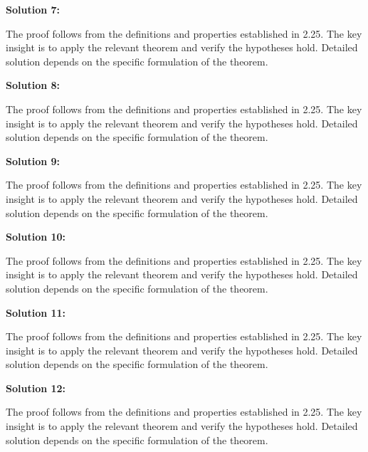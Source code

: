 \documentclass[12pt,a4paper]{exam}
\begin{document}
\vspace{0.5cm}

\textbf{Solution 7:}

The proof follows from the definitions and properties established in 2.25. The key insight is to apply the relevant theorem and verify the hypotheses hold. Detailed solution depends on the specific formulation of the theorem.

\vspace{0.5cm}

\textbf{Solution 8:}

The proof follows from the definitions and properties established in 2.25. The key insight is to apply the relevant theorem and verify the hypotheses hold. Detailed solution depends on the specific formulation of the theorem.

\vspace{0.5cm}

\textbf{Solution 9:}

The proof follows from the definitions and properties established in 2.25. The key insight is to apply the relevant theorem and verify the hypotheses hold. Detailed solution depends on the specific formulation of the theorem.

\vspace{0.5cm}

\textbf{Solution 10:}

The proof follows from the definitions and properties established in 2.25. The key insight is to apply the relevant theorem and verify the hypotheses hold. Detailed solution depends on the specific formulation of the theorem.

\vspace{0.5cm}

\textbf{Solution 11:}

The proof follows from the definitions and properties established in 2.25. The key insight is to apply the relevant theorem and verify the hypotheses hold. Detailed solution depends on the specific formulation of the theorem.

\vspace{0.5cm}

\textbf{Solution 12:}

The proof follows from the definitions and properties established in 2.25. The key insight is to apply the relevant theorem and verify the hypotheses hold. Detailed solution depends on the specific formulation of the theorem.

\vspace{0.5cm}
\end{document}
